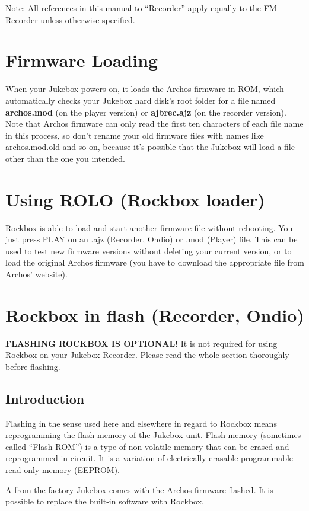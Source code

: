 Note: All references in this manual to
``Recorder'' apply equally to the FM Recorder
unless otherwise specified.

\section{\label{ref:FirmwareLoading}Firmware Loading}
When your Jukebox powers on, it loads the Archos firmware in ROM, which
automatically checks your Jukebox hard disk's root folder for a file
named \textbf{archos.mod} (on the player version) or
\textbf{ajbrec.ajz} (on the recorder version). Note that Archos
firmware can only read the first ten characters of each file name in
this process, so don't rename your old firmware files with names like
archos.mod.old and so on, because it's possible that the Jukebox will
load a file other than the one you intended.

\section{\label{ref:PartISection4}Using ROLO (Rockbox loader)}
Rockbox is able to load and start another firmware file without
rebooting. You just press PLAY on an .ajz (Recorder, Ondio) or .mod
(Player) file. This can be used to test new firmware versions without
deleting your current version, or to load the original Archos firmware
(you have to download the appropriate file from
Archos' website). 

\section{\label{ref:Rockboxinflash}Rockbox in flash (Recorder, Ondio)}
\textbf{FLASHING ROCKBOX IS OPTIONAL!} It is not required for using
Rockbox on your Jukebox Recorder. Please read the whole section
thoroughly before flashing.

\subsection{\label{ref:PartISection61}Introduction}
Flashing in the sense used here and elsewhere in regard to Rockbox means
reprogramming the flash memory of the Jukebox unit. Flash memory
(sometimes called ``Flash ROM'') is a type of
non{}-volatile memory that can be erased and reprogrammed in circuit. It is a variation of electrically erasable
programmable read{}-only memory (EEPROM). 

A from the factory Jukebox comes with the Archos firmware flashed. It is
possible to replace the built{}-in software with Rockbox. 

